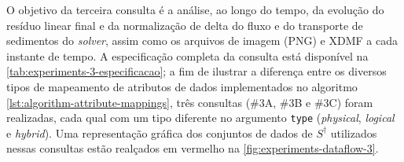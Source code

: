 O objetivo da terceira consulta é a análise, ao longo do tempo, da evolução do resíduo linear final e da normalização de delta do fluxo e do transporte de sedimentos do \textit{solver}, assim como os arquivos de imagem (PNG) e XDMF a cada instante de tempo. A especificação completa da consulta está disponível na \autoref{tab:experiments-3-especificacao}; a fim de ilustrar a diferença entre os diversos tipos de mapeamento de atributos de dados implementados no algoritmo \autoref{lst:algorithm-attribute-mappings}, três consultas (\#3A, \#3B e \#3C) foram realizadas, cada qual com um tipo diferente no argumento \texttt{type} (\textit{physical}, \textit{logical} e \textit{hybrid}). Uma representação gráfica dos conjuntos de dados de \(S^{\dagger}\) utilizados nessas consultas estão realçados em vermelho na \autoref{fig:experiments-dataflow-3}.

